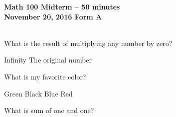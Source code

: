\documentclass[10pt]{exam}
\begin{document}
\setlength\fillinlinelength{0.5in}
\header{}
{\bf{Math 100
 Midterm
 -- 50 minutes
\\November 20, 2016
}}
{\bf{Form A}\\~}
\vspace{.5cm}
\begin{questions}

\begin{minipage}[c]{\linewidth}
\question What is the result of multiplying any number by zero?
\begin{choices}
\vspace{-0.1in}
\choice Infinity
\vspace{-0.1in}
\choice The original number
\vspace{-0.1in}
\end{choices}
\end{minipage}

\begin{minipage}[c]{\linewidth}
\question What is my favorite color?
\begin{choices}
\choice Green
\vspace{-0.1in}
\choice Black
\vspace{-0.1in}
\choice Blue
\vspace{-0.1in}
\choice Red\end{choices}
\end{minipage}

\begin{minipage}[c]{\linewidth}
\question What is sum of one and one?
\begin{choices}
\vspace{-0.1in}
\vspace{-0.1in}
\vspace{-0.1in}
\end{choices}
\end{minipage}

\end{questions}
\end{document}
